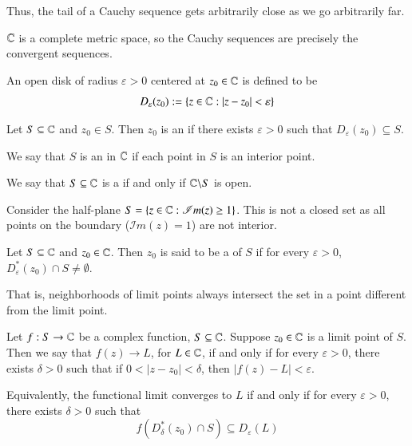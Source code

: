 \documentclass[12pt, a4paper, oneside, openright, titlepage]{book}
\begin{document}
Thus, the tail of a Cauchy sequence gets arbitrarily close as we go arbitrarily far.

$\mathbb C$ is a complete metric space, so the Cauchy sequences are precisely the convergent sequences.


\begin{defn}
    An open disk of radius $\varepsilon > 0$ centered at $z_0 \in \mathbb C$ is defined to be \begin{equation*}
        D_{\varepsilon}(z_0) := \{z \in \mathbb C: |z-z_0| < \varepsilon\}
    \end{equation*}
\end{defn}

\begin{defn}
    Let $S \subseteq \mathbb C$ and $z_0 \in S$. Then $z_0$ is an  if there exists $\varepsilon > 0$ such that $D_{\varepsilon}(z_0) \subseteq S$. 

    We say that $S$ is an  in $\mathbb C$ if each point in $S$ is an interior point.
\end{defn}

\begin{defn}
    We say that $S \subseteq \mathbb C$ is a  if and only if $\mathbb C\backslash S$ is open.
\end{defn}

\begin{eg}
    Consider the half-plane $S = \{z \in \mathbb C: \mathscr{I}m(z) \geq 1\}$. This is not a closed set as all points on the boundary ($\mathscr{I}m(z) = 1$) are not interior.
\end{eg}

\begin{defn}
    Let $S \subseteq \mathbb C$ and $z_0 \in \mathbb C$. Then $z_0$ is said to be a  of $S$ if for every $\varepsilon > 0$, $D_{\varepsilon}^*(z_0)\cap S \neq \emptyset$. 
\end{defn}
That is, neighborhoods of limit points always intersect the set in a point different from the limit point.

\begin{defn}
    Let $f:S\rightarrow \mathbb C$ be a complex function, $S \subseteq \mathbb C$. Suppose $z_0 \in \mathbb C$ is a limit point of $S$. Then we say that $f(z) \rightarrow L$, for $L \in \mathbb C$, if and only if for every $\varepsilon > 0$, there exists $\delta > 0$ such that if $0 < |z-z_0| < \delta$, then $|f(z) - L| < \varepsilon$. 


    Equivalently, the functional limit converges to $L$ if and only if for every $\varepsilon > 0$, there exists $\delta > 0$ such that \begin{equation*}
        f(D_{\delta}^*(z_0)\cap S) \subseteq D_{\varepsilon}(L)
    \end{equation*}
\end{defn}
\end{document}
